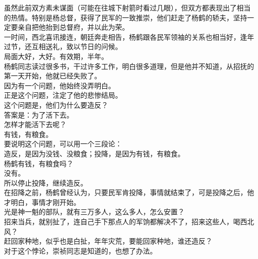 \begin{multicols}{\theparacolNo}
虽然此前双方素未谋面（可能在往城下射箭时看过几眼），但双方都表现出了相当的热情。特别是杨总督，获得了民军的一致推崇，他们赶走了杨鹤的轿夫，坚持一定要亲自把他抬到总督府，并以此为荣。\\

一时间，西北喜讯接连，朝廷奔走相告，杨鹤跟各民军领袖的关系也相当好，逢年过节，还互相送礼，致以节日的问候。\\

局面大好，大好。有效期，半年。\\

杨鹤同志读过很多书，干过许多工作，明白很多道理，但是他并不知道，从招抚的第一天开始，他就已经失败了。\\

因为有一个问题，他始终没弄明白。\\

正是这个问题，注定了他的悲惨结局。\\

这个问题是，他们为什么要造反？\\

答案是：为了活下去。\\

怎样才能活下去呢？\\

有钱，有粮食。\\

要说明这个问题，可以用一个三段论：\\

造反，是因为没钱、没粮食；投降，是因为有钱，有粮食。\\

杨鹤有钱，有粮食吗？\\

没有。\\

所以停止投降，继续造反。\\

在招降之前，杨鹤曾经认为，只要民军肯投降，事情就结束了，可是投降之后，他才明白，事情才刚开始。\\

光是神一魁的部队，就有三万多人，这么多人，怎么安置？\\

招来当兵，就别扯了，连自己手下那点人的军饷都解决不了，招来这些人，喝西北风？\\

赶回家种地，似乎也是白扯，年年灾荒，要能回家种地，谁还造反？\\

对于这个悖论，崇祯同志是知道的，也想了办法。\\


\end{multicols}
